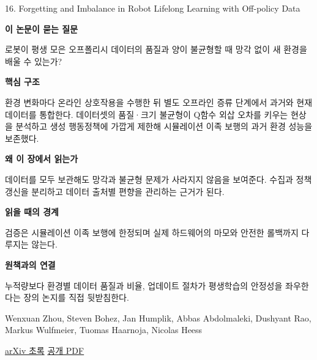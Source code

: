 \documentclass[11pt,openany]{book}
\begin{document}
\begin{termcard}{16. Forgetting and Imbalance in Robot Lifelong Learning with Off-policy Data}

\par

\medskip

{\sffamily\bfseries\color{deepblue} 이 논문이 묻는 질문}\par

로봇이 평생 모은 오프폴리시 데이터의 품질과 양이 불균형할 때 망각 없이 새 환경을 배울 수 있는가?

\smallskip

{\sffamily\bfseries\color{deepblue} 핵심 구조}\par

환경 변화마다 온라인 상호작용을 수행한 뒤 별도 오프라인 증류 단계에서 과거와 현재 데이터를 통합한다. 데이터셋의 품질·크기 불균형이 Q함수 외삽 오차를 키우는 현상을 분석하고 생성 행동정책에 가깝게 제한해 시뮬레이션 이족 보행의 과거 환경 성능을 보존했다.

\smallskip

{\sffamily\bfseries\color{deepblue} 왜 이 장에서 읽는가}\par

데이터를 모두 보관해도 망각과 불균형 문제가 사라지지 않음을 보여준다. 수집과 정책 갱신을 분리하고 데이터 출처별 편향을 관리하는 근거가 된다.

\smallskip

{\sffamily\bfseries\color{coral} 읽을 때의 경계}\par

검증은 시뮬레이션 이족 보행에 한정되며 실제 하드웨어의 마모와 안전한 롤백까지 다루지는 않는다.

\smallskip

{\sffamily\bfseries\color{teal} 원책과의 연결}\par

누적량보다 환경별 데이터 품질과 비율, 업데이트 절차가 평생학습의 안정성을 좌우한다는 장의 논지를 직접 뒷받침한다.

\medskip

{\footnotesize\color{muted} Wenxuan Zhou, Steven Bohez, Jan Humplik, Abbas Abdolmaleki, Dushyant Rao, Markus Wulfmeier, Tuomas Haarnoja, Nicolas Heess\par

\href{https://arxiv.org/abs/2204.05893}{arXiv 초록} \quad \href{https://arxiv.org/pdf/2204.05893}{공개 PDF}\par}

\end{termcard}
\end{document}
